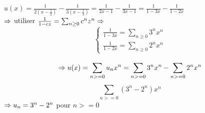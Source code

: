 \begin{exercice}
$u(x) = \frac{1}{2(x-\frac{1}{2})} - \frac{1}{3(x-\frac{1}{3})} = \frac{1}{2x-1}-\frac{1}{3x-1} = \frac{1}{1-3x} - \frac{1}{1-2x}$\\

$\Rightarrow$ utiliser $\frac{1}{1-cz} = \sum_{n \ge 0}c^nz^n \Rightarrow$
\[ \begin{cases}
	\frac{1}{1-3x} = \sum_{n\ge0}3^nx^n\\
	\frac{1}{1-2x} = \sum_{n\ge0}2^nx^n
\end{cases}\]

\[\Rightarrow u(x) = \sum_{n>=0}^{} u_{n}x^{n}=\sum_{n>=0}^{} 3^{n}x^{n}-\sum_{n>=0}^{} 2^{n}x^{n}\]
\[\sum_{n>=0}^{} (3^{n}-2^{n})x^{n}\]
$\Rightarrow u_{n} = 3^{n}-2^{n}$ pour $n>=0$

\end{exercice}

